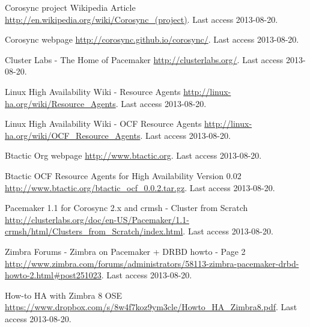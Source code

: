 \begin{thebibliography}{1}

 Corosync project Wikipedia Article
\url{http://en.wikipedia.org/wiki/Corosync_(project)}. Last access 2013-08-20.

 Corosync webpage
\url{http://corosync.github.io/corosync/}. Last access 2013-08-20.

 Cluster Labs - The Home of Pacemaker
\url{http://clusterlabs.org/}. Last access 2013-08-20.


 Linux High Availability Wiki - Resource Agents
\url{http://linux-ha.org/wiki/Resource_Agents}. Last access 2013-08-20.

 Linux High Availability Wiki - OCF Resource Agents
\url{http://linux-ha.org/wiki/OCF_Resource_Agents}. Last access 2013-08-20.

 Btactic Org webpage
\url{http://www.btactic.org}. Last access 2013-08-20.

 Btactic OCF Resource Agents for High Availability Version 0.02
\url{http://www.btactic.org/btactic_ocf_0.0.2.tar.gz}. Last access 2013-08-20.


 Pacemaker 1.1 for Corosync 2.x and crmsh - Cluster from Scratch
\url{http://clusterlabs.org/doc/en-US/Pacemaker/1.1-crmsh/html/Clusters_from_Scratch/index.html}. Last access 2013-08-20.


 Zimbra Forums - Zimbra on Pacemaker + DRBD howto - Page 2
\url{http://www.zimbra.com/forums/administrators/58113-zimbra-pacemaker-drbd-howto-2.html#post251023}. Last access 2013-08-20.

 How-to HA with Zimbra 8 OSE
\url{https://www.dropbox.com/s/8w4f7koz9ym3cle/Howto_HA_Zimbra8.pdf}. Last access 2013-08-20.

\end{thebibliography}

